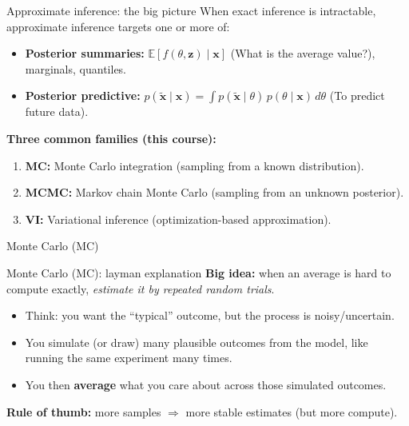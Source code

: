 \documentclass[aspectratio=169]{beamer}
\begin{document}
\begin{frame}{Approximate inference: the big picture}
  When exact inference is intractable, approximate inference targets one or more of:
  \begin{itemize}
    \item \textbf{Posterior summaries:} $\mathbb{E}[f(\theta,\bm{z})\mid \bm{x}]$ (What is the average value?), marginals, quantiles.
    \item \textbf{Posterior predictive:} $p(\tilde{\bm{x}}\mid \bm{x})=\int p(\tilde{\bm{x}}\mid \theta)\,p(\theta\mid \bm{x})\,d\theta$ (To predict future data).
  \end{itemize}

  \vspace{0.6em}
  \textbf{Three common families (this course):}
  \begin{enumerate}
    \item \textbf{MC:} Monte Carlo integration (sampling from a known distribution).
    \item \textbf{MCMC:} Markov chain Monte Carlo (sampling from an unknown posterior).
    \item \textbf{VI:} Variational inference (optimization-based approximation).
  \end{enumerate}
\end{frame}



\begin{frame}[plain]
    \centering
    \vfill
    {Monte Carlo (MC) \par}
    \vfill
  \end{frame}


\begin{frame}{Monte Carlo (MC): layman explanation}
  \textbf{Big idea:} when an average is hard to compute exactly, \emph{estimate it by repeated random trials}.

  \vspace{0.4em}
  \begin{itemize}
    \item Think: you want the ``typical'' outcome, but the process is noisy/uncertain.
    \item You simulate (or draw) many plausible outcomes from the model, like running the same experiment many times.
    \item You then \textbf{average} what you care about across those simulated outcomes.
  \end{itemize}


  \vspace{0.4em}
  \textbf{Rule of thumb:} more samples $\Rightarrow$ more stable estimates (but more compute).
\end{frame}
\end{document}
